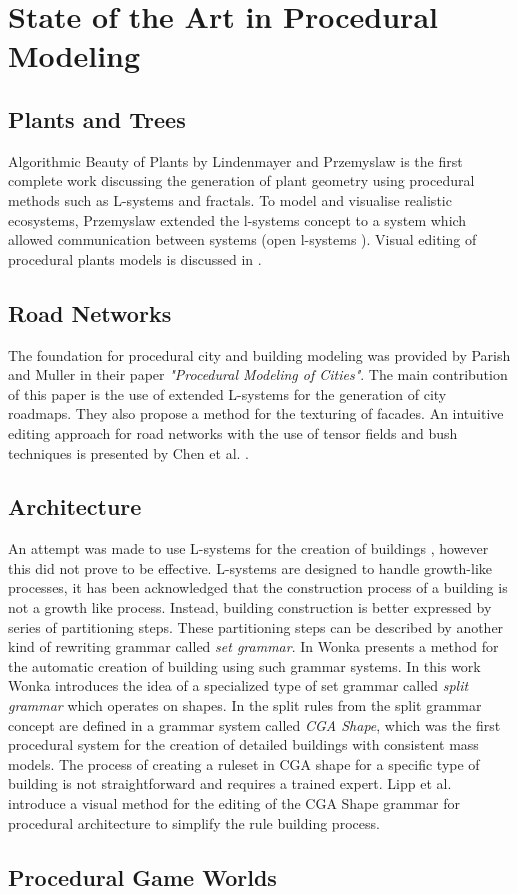 
\chapter{State of the Art in Procedural Modeling}
\label{sec:relatedwork}


\section{Plants and Trees}
Algorithmic Beauty of Plants by Lindenmayer and Przemyslaw \citep{PrzemyslawAlgoBeauty} is the first complete work discussing the generation of plant geometry using procedural methods such as L-systems and fractals. To model and visualise realistic ecosystems, Przemyslaw extended the l-systems concept to a system which allowed communication between systems (open l-systems \citep{PrzemyslawPlants} \citep{Deussen98}). Visual editing of procedural plants models is discussed in \citet{interactivebonsai}. 

\section{Road Networks}
The foundation for procedural city and building modeling was provided by Parish and Muller \citet{Parish01} in their paper \emph{"Procedural Modeling of Cities"}. The main contribution of this paper is the use of extended L-systems for the generation of city roadmaps. They also propose a method for the texturing of facades. An intuitive editing approach for road networks with the use of tensor fields and bush techniques is presented by Chen et al. \citet{Chen08}. 

\section{Architecture}
An attempt was made to use L-systems for the creation of buildings \citet{Parish01}, however this did not prove to be effective. L-systems are designed to handle growth-like processes, it has been acknowledged that the construction process of a building is not a growth like process. Instead, building construction is better expressed by series of partitioning steps. These partitioning steps can be described by another kind of rewriting grammar called \emph{set grammar}. In \citet{Wonka03} Wonka presents a method for the automatic creation of building using such grammar systems. In this work Wonka introduces the idea of a specialized type of set grammar called \emph{split grammar} which operates on shapes. In \citet{Muller06} the split rules from the split grammar concept are defined in a grammar system called \emph{CGA Shape}, which was the first procedural system for the creation of detailed buildings with consistent mass 
models. The process of creating a ruleset in CGA shape for a specific type of building is not straightforward and requires a trained expert. Lipp et al. \citet{Lipp08} introduce a visual method for the editing of the CGA Shape grammar for procedural architecture to simplify the rule building process.

\section{Procedural Game Worlds}

